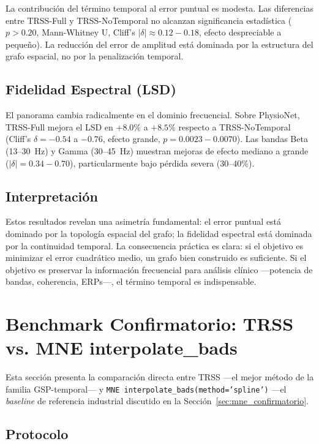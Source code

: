 La contribución del término temporal al error puntual es modesta. Las diferencias entre TRSS-Full y TRSS-NoTemporal no alcanzan significancia estadística ($p > 0.20$, Mann-Whitney U, Cliff's $|\delta| \approx 0.12{-}0.18$, efecto despreciable a pequeño). La reducción del error de amplitud está dominada por la estructura del grafo espacial, no por la penalización temporal.

\subsection{Fidelidad Espectral (LSD)}

El panorama cambia radicalmente en el dominio frecuencial. Sobre PhysioNet, TRSS-Full mejora el LSD en $+8.0\%$ a $+8.5\%$ respecto a TRSS-NoTemporal (Cliff's $\delta = -0.54$ a $-0.76$, efecto grande, $p = 0.0023{-}0.0070$). Las bandas Beta (13--30~Hz) y Gamma (30--45~Hz) muestran mejoras de efecto mediano a grande ($|\delta| = 0.34{-}0.70$), particularmente bajo pérdida severa (30--40\%).

\subsection{Interpretación}

Estos resultados revelan una asimetría fundamental: el error puntual está dominado por la topología espacial del grafo; la fidelidad espectral está dominada por la continuidad temporal. La consecuencia práctica es clara: si el objetivo es minimizar el error cuadrático medio, un grafo bien construido es suficiente. Si el objetivo es preservar la información frecuencial para análisis clínico —potencia de bandas, coherencia, ERPs—, el término temporal es indispensable.

\section{Benchmark Confirmatorio: TRSS vs. MNE interpolate\_bads}
\label{sec:resultados_mne}

Esta sección presenta la comparación directa entre TRSS —el mejor método de la familia GSP-temporal— y \texttt{MNE interpolate\_bads(method='spline')} —el \textit{baseline} de referencia industrial discutido en la Sección~\ref{sec:mne_confirmatorio}.

\subsection{Protocolo}

